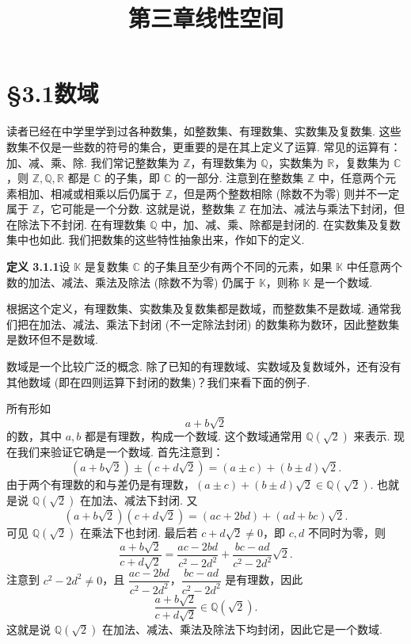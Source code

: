 \documentclass[UTF8, 12pt, fontset=fandol, oneside]{ctexart}
\title{第三章\quad 线性空间}
\author{}
\date{}
\begin{document}
\maketitle

\section*{§3.1\quad 数域}

读者已经在中学里学到过各种数集，如整数集、有理数集、实数集及复数集. 这些数集不仅是一些数的符号的集合，更重要的是在其上定义了运算. 常见的运算有：加、减、乘、除. 我们常记整数集为 $\mathbb{Z}$，有理数集为 $\mathbb{Q}$，实数集为 $\mathbb{R}$，复数集为 $\mathbb{C}$，则 $\mathbb{Z},\mathbb{Q},\mathbb{R}$ 都是 $\mathbb{C}$ 的子集，即 $\mathbb{C}$ 的一部分. 注意到在整数集 $\mathbb{Z}$ 中，任意两个元素相加、相减或相乘以后仍属于 $\mathbb{Z}$，但是两个整数相除 (除数不为零) 则并不一定属于 $\mathbb{Z}$，它可能是一个分数. 这就是说，整数集 $\mathbb{Z}$ 在加法、减法与乘法下封闭，但在除法下不封闭. 在有理数集 $\mathbb{Q}$ 中，加、减、乘、除都是封闭的. 在实数集及复数集中也如此. 我们把数集的这些特性抽象出来，作如下的定义.

\noindent\textbf{定义 3.1.1}\quad 设 $\mathbb{K}$ 是复数集 $\mathbb{C}$ 的子集且至少有两个不同的元素，如果 $\mathbb{K}$ 中任意两个数的加法、减法、乘法及除法 (除数不为零) 仍属于 $\mathbb{K}$，则称 $\mathbb{K}$ 是一个数域.

根据这个定义，有理数集、实数集及复数集都是数域，而整数集不是数域. 通常我们把在加法、减法、乘法下封闭 (不一定除法封闭) 的数集称为数环，因此整数集是数环但不是数域.

数域是一个比较广泛的概念. 除了已知的有理数域、实数域及复数域外，还有没有其他数域 (即在四则运算下封闭的数集)？我们来看下面的例子.

所有形如
\[
a+b\sqrt{2}
\]
的数，其中 $a,b$ 都是有理数，构成一个数域. 这个数域通常用 $\mathbb{Q}(\sqrt{2})$ 来表示. 现在我们来验证它确是一个数域. 首先注意到：
\[
(a+b\sqrt{2})\pm(c+d\sqrt{2})=(a\pm c)+(b\pm d)\sqrt{2}.
\]
由于两个有理数的和与差仍是有理数，$(a\pm c)+(b\pm d)\sqrt{2}\in\mathbb{Q}(\sqrt{2})$. 也就是说 $\mathbb{Q}(\sqrt{2})$ 在加法、减法下封闭. 又
\[
(a+b\sqrt{2})(c+d\sqrt{2})=(ac+2bd)+(ad+bc)\sqrt{2}.
\]
可见 $\mathbb{Q}(\sqrt{2})$ 在乘法下也封闭. 最后若 $c+d\sqrt{2}\neq 0$，即 $c,d$ 不同时为零，则
\[
\frac{a+b\sqrt{2}}{c+d\sqrt{2}}
=\frac{ac-2bd}{c^2-2d^2}+\frac{bc-ad}{c^2-2d^2}\sqrt{2}.
\]
注意到 $c^2-2d^2\neq 0$，且 $\dfrac{ac-2bd}{c^2-2d^2}$，$\dfrac{bc-ad}{c^2-2d^2}$ 是有理数，因此
\[
\frac{a+b\sqrt{2}}{c+d\sqrt{2}}\in\mathbb{Q}(\sqrt{2}).
\]
这就是说 $\mathbb{Q}(\sqrt{2})$ 在加法、减法、乘法及除法下均封闭，因此它是一个数域.
\end{document}
